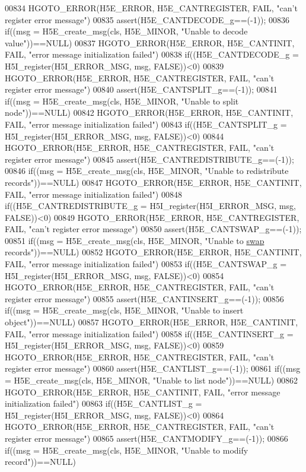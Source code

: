 \begin{DoxyCode}
00834     HGOTO\_ERROR(H5E\_ERROR, H5E\_CANTREGISTER, FAIL, "can't register error message")
00835 assert(H5E\_CANTDECODE\_g==(-1));
00836 if((msg = H5E\_create\_msg(cls, H5E\_MINOR, "Unable to decode value"))==NULL)
00837     HGOTO\_ERROR(H5E\_ERROR, H5E\_CANTINIT, FAIL, "error message initialization failed")
00838 if((H5E\_CANTDECODE\_g = H5I\_register(H5I\_ERROR\_MSG, msg, FALSE))<0)
00839     HGOTO\_ERROR(H5E\_ERROR, H5E\_CANTREGISTER, FAIL, "can't register error message")
00840 assert(H5E\_CANTSPLIT\_g==(-1));
00841 if((msg = H5E\_create\_msg(cls, H5E\_MINOR, "Unable to split node"))==NULL)
00842     HGOTO\_ERROR(H5E\_ERROR, H5E\_CANTINIT, FAIL, "error message initialization failed")
00843 if((H5E\_CANTSPLIT\_g = H5I\_register(H5I\_ERROR\_MSG, msg, FALSE))<0)
00844     HGOTO\_ERROR(H5E\_ERROR, H5E\_CANTREGISTER, FAIL, "can't register error message")
00845 assert(H5E\_CANTREDISTRIBUTE\_g==(-1));
00846 if((msg = H5E\_create\_msg(cls, H5E\_MINOR, "Unable to redistribute records"))==NULL)
00847     HGOTO\_ERROR(H5E\_ERROR, H5E\_CANTINIT, FAIL, "error message initialization failed")
00848 if((H5E\_CANTREDISTRIBUTE\_g = H5I\_register(H5I\_ERROR\_MSG, msg, FALSE))<0)
00849     HGOTO\_ERROR(H5E\_ERROR, H5E\_CANTREGISTER, FAIL, "can't register error message")
00850 assert(H5E\_CANTSWAP\_g==(-1));
00851 if((msg = H5E\_create\_msg(cls, H5E\_MINOR, "Unable to \hyperlink{endian_8c_a3ca5ecd34b04d6a243c054ac3a57f68d}{swap} records"))==NULL)
00852     HGOTO\_ERROR(H5E\_ERROR, H5E\_CANTINIT, FAIL, "error message initialization failed")
00853 if((H5E\_CANTSWAP\_g = H5I\_register(H5I\_ERROR\_MSG, msg, FALSE))<0)
00854     HGOTO\_ERROR(H5E\_ERROR, H5E\_CANTREGISTER, FAIL, "can't register error message")
00855 assert(H5E\_CANTINSERT\_g==(-1));
00856 if((msg = H5E\_create\_msg(cls, H5E\_MINOR, "Unable to insert \textcolor{keywordtype}{object}"))==NULL)
00857     HGOTO\_ERROR(H5E\_ERROR, H5E\_CANTINIT, FAIL, "error message initialization failed")
00858 if((H5E\_CANTINSERT\_g = H5I\_register(H5I\_ERROR\_MSG, msg, FALSE))<0)
00859     HGOTO\_ERROR(H5E\_ERROR, H5E\_CANTREGISTER, FAIL, "can't register error message")
00860 assert(H5E\_CANTLIST\_g==(-1));
00861 if((msg = H5E\_create\_msg(cls, H5E\_MINOR, "Unable to list node"))==NULL)
00862     HGOTO\_ERROR(H5E\_ERROR, H5E\_CANTINIT, FAIL, "error message initialization failed")
00863 if((H5E\_CANTLIST\_g = H5I\_register(H5I\_ERROR\_MSG, msg, FALSE))<0)
00864     HGOTO\_ERROR(H5E\_ERROR, H5E\_CANTREGISTER, FAIL, "can't register error message")
00865 assert(H5E\_CANTMODIFY\_g==(-1));
00866 if((msg = H5E\_create\_msg(cls, H5E\_MINOR, "Unable to modify record"))==NULL)

\end{DoxyCode}
